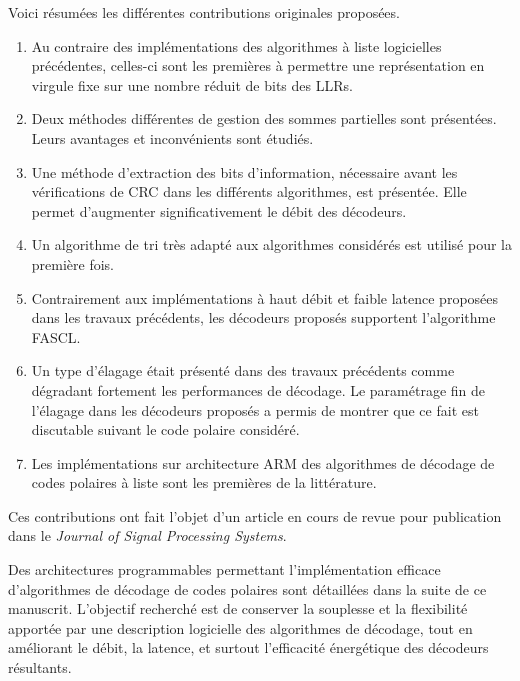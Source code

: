 Voici résumées les différentes contributions originales proposées.
\begin{enumerate}[label=(\roman*)]
  \item Au contraire des implémentations des algorithmes à liste logicielles précédentes, celles-ci sont les premières à permettre une représentation en virgule fixe sur une nombre réduit de bits des LLRs.
  \item Deux méthodes différentes de gestion des sommes partielles sont présentées. Leurs avantages et inconvénients sont étudiés.
  \item Une méthode d'extraction des bits d'information, nécessaire avant les vérifications de CRC dans les différents algorithmes, est présentée. Elle permet d'augmenter significativement le débit des décodeurs.
  \item Un algorithme de tri \cite{schreier_tournament_1932} très adapté aux algorithmes considérés est utilisé pour la première fois.
  \item Contrairement aux implémentations à haut débit et faible latence proposées dans les travaux précédents, les décodeurs proposés supportent l'algorithme FASCL.
  \item Un type d'élagage était présenté dans des travaux précédents comme dégradant fortement les performances de décodage. Le paramétrage fin de l'élagage dans les décodeurs proposés a permis de montrer que ce fait est discutable suivant le code polaire considéré.
  \item Les implémentations sur architecture ARM des algorithmes de décodage de codes polaires à liste sont les premières de la littérature.
\end{enumerate}
Ces contributions ont fait l'objet d'un article en cours de revue \cite{leonardon_fast_2017} pour publication dans le \textit{Journal of Signal Processing Systems}.


Des architectures programmables permettant l'implémentation efficace d'algorithmes de décodage de codes polaires sont détaillées dans la suite de ce manuscrit. L'objectif recherché est de conserver  la souplesse et la flexibilité apportée par une description logicielle des algorithmes de décodage, tout en améliorant le débit, la latence, et surtout l'efficacité énergétique des décodeurs résultants.
